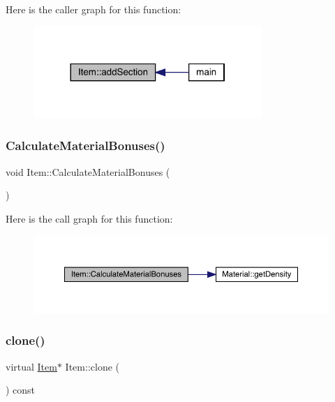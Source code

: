 Here is the caller graph for this function\+:
\nopagebreak
\begin{figure}[H]
\begin{center}
\leavevmode
\includegraphics[width=245pt]{dc/d32/class_item_a6c9f73ef36b176cdb75bc9b13d5be8e8_icgraph}
\end{center}
\end{figure}
\mbox{\label{class_item_a8f02bc86b6f66142e35a660a5c28ba74}} 
\subsubsection{\texorpdfstring{Calculate\+Material\+Bonuses()}{CalculateMaterialBonuses()}}
{\footnotesize\ttfamily void Item\+::\+Calculate\+Material\+Bonuses (\begin{DoxyParamCaption}{ }\end{DoxyParamCaption})}

Here is the call graph for this function\+:
\nopagebreak
\begin{figure}[H]
\begin{center}
\leavevmode
\includegraphics[width=350pt]{dc/d32/class_item_a8f02bc86b6f66142e35a660a5c28ba74_cgraph}
\end{center}
\end{figure}
\mbox{\label{class_item_a6d963581e2caad2e08979683a827f39f}} 
\subsubsection{\texorpdfstring{clone()}{clone()}}
{\footnotesize\ttfamily virtual \mbox{\hyperlink{class_item}{Item}}$\ast$ Item\+::clone (\begin{DoxyParamCaption}{ }\end{DoxyParamCaption}) const\hspace{0.3cm}{\ttfamily [pure virtual]}}



